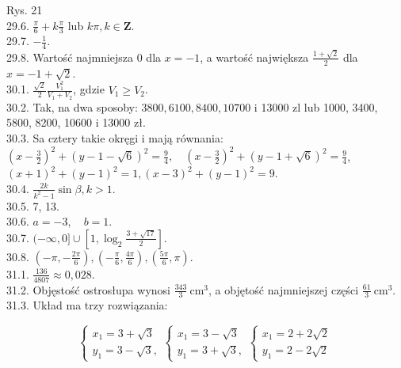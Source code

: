 \documentclass[10pt]{article}
\begin{document}
Rys. 21\\
29.6. $\frac{\pi}{6}+k \frac{\pi}{3}$ lub $k \pi, k \in \mathbf{Z}$.\\
29.7. $-\frac{1}{4}$.\\
29.8. Wartość najmniejsza 0 dla $x=-1$, a wartość największa $\frac{1+\sqrt{2}}{2}$ dla $x=-1+\sqrt{2}$.\\
30.1. $\frac{\sqrt{2}}{2} \frac{V_{1}^{2}}{V_{1}+V_{2}}$, gdzie $V_{1} \geq V_{2}$.\\
30.2. Tak, na dwa sposoby: $3800,6100,8400,10700$ i 13000 zl lub 1000, 3400, 5800, 8200, 10600 i 13000 zł.\\
30.3. Sa cztery takie okręgi i mają równania:\\
$\left(x-\frac{3}{2}\right)^{2}+(y-1-\sqrt{6})^{2}=\frac{9}{4}, \quad\left(x-\frac{3}{2}\right)^{2}+(y-1+\sqrt{6})^{2}=\frac{9}{4}$,\\
$(x+1)^{2}+(y-1)^{2}=1,(x-3)^{2}+(y-1)^{2}=9$.\\
30.4. $\frac{2 k}{k^{2}-1} \sin \beta, k>1$.\\
30.5. 7, 13.\\
30.6. $a=-3, \quad b=1$.\\
30.7. $(-\infty, 0] \cup\left[1, \log _{2} \frac{3+\sqrt{17}}{2}\right]$.\\
30.8. $\left(-\pi,-\frac{2 \pi}{6}\right),\left(-\frac{\pi}{6}, \frac{4 \pi}{6}\right),\left(\frac{5 \pi}{6}, \pi\right)$.\\
31.1. $\frac{136}{4807} \approx 0,028$.\\
31.2. Objęstość ostrosłupa wynosi $\frac{343}{3} \mathrm{~cm}^{3}$, a objętość najmniejszej części $\frac{61}{3} \mathrm{~cm}^{3}$.\\
31.3. Układ ma trzy rozwiązania:

$$
\left\{\begin{array} { l } 
{ x _ { 1 } = 3 + \sqrt { 3 } } \\
{ y _ { 1 } = 3 - \sqrt { 3 } , }
\end{array} \left\{\begin{array} { l } 
{ x _ { 1 } = 3 - \sqrt { 3 } } \\
{ y _ { 1 } = 3 + \sqrt { 3 } , }
\end{array} \left\{\begin{array}{l}
x_{1}=2+2 \sqrt{2} \\
y_{1}=2-2 \sqrt{2}
\end{array}\right.\right.\right.
$$
\end{document}
